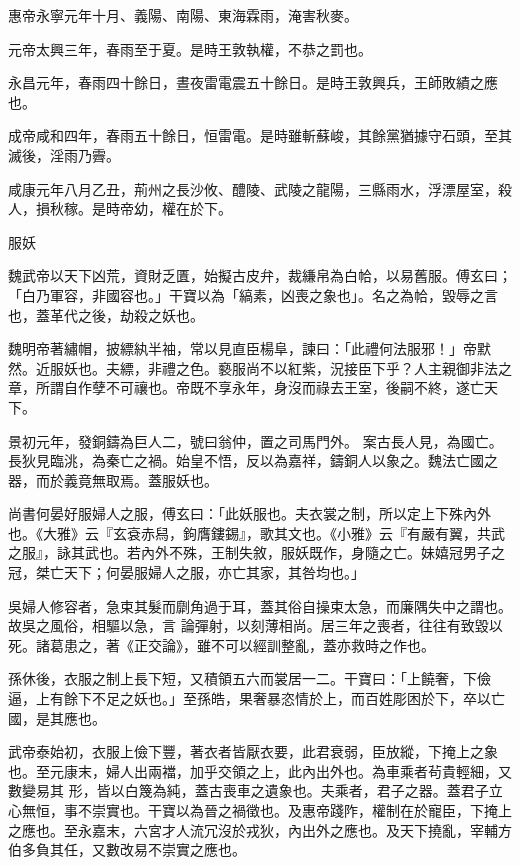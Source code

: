 \begin{pinyinscope}
 惠帝永寧元年十月、義陽、南陽、東海霖雨，淹害秋麥。



 元帝太興三年，春雨至于夏。是時王敦執權，不恭之罰也。



 永昌元年，春雨四十餘日，晝夜雷電震五十餘日。是時王敦興兵，王師敗績之應也。



 成帝咸和四年，春雨五十餘日，恒雷電。是時雖斬蘇峻，其餘黨猶據守石頭，至其滅後，淫雨乃霽。



 咸康元年八月乙丑，荊州之長沙攸、醴陵、武陵之龍陽，三縣雨水，浮漂屋室，殺人，損秋稼。是時帝幼，權在於下。



 服妖



 魏武帝以天下凶荒，資財乏匱，始擬古皮弁，裁縑帛為白帢，以易舊服。傅玄曰；「白乃軍容，非國容也。」干寶以為「縞素，凶喪之象也」。名之為帢，毀辱之言也，蓋革代之後，劫殺之妖也。



 魏明帝著繡帽，披縹紈半袖，常以見直臣楊阜，諫曰：「此禮何法服邪！」帝默然。近服妖也。夫縹，非禮之色。褻服尚不以紅紫，況接臣下乎？人主親御非法之章，所謂自作孽不可禳也。帝既不享永年，身沒而祿去王室，後嗣不終，遂亡天下。



 景初元年，發銅鑄為巨人二，號曰翁仲，置之司馬門外。
 案古長人見，為國亡。長狄見臨洮，為秦亡之禍。始皇不悟，反以為嘉祥，鑄銅人以象之。魏法亡國之器，而於義竟無取焉。蓋服妖也。



 尚書何晏好服婦人之服，傅玄曰：「此妖服也。夫衣裳之制，所以定上下殊內外也。《大雅》云『玄袞赤舄，鉤膺鏤錫』，歌其文也。《小雅》云『有嚴有翼，共武之服』，詠其武也。若內外不殊，王制失敘，服妖既作，身隨之亡。妹嬉冠男子之冠，桀亡天下；何晏服婦人之服，亦亡其家，其咎均也。」



 吳婦人修容者，急束其髮而劘角過于耳，蓋其俗自操束太急，而廉隅失中之謂也。故吳之風俗，相驅以急，言
 論彈射，以刻薄相尚。居三年之喪者，往往有致毀以死。諸葛患之，著《正交論》，雖不可以經訓整亂，蓋亦救時之作也。



 孫休後，衣服之制上長下短，又積領五六而裳居一二。干寶曰：「上饒奢，下儉逼，上有餘下不足之妖也。」至孫皓，果奢暴恣情於上，而百姓彫困於下，卒以亡國，是其應也。



 武帝泰始初，衣服上儉下豐，著衣者皆厭衣要，此君衰弱，臣放縱，下掩上之象也。至元康末，婦人出兩襠，加乎交領之上，此內出外也。為車乘者茍貴輕細，又數變易其
 形，皆以白篾為純，蓋古喪車之遺象也。夫乘者，君子之器。蓋君子立心無恒，事不崇實也。干寶以為晉之禍徵也。及惠帝踐阼，權制在於寵臣，下掩上之應也。至永嘉末，六宮才人流冗沒於戎狄，內出外之應也。及天下撓亂，宰輔方伯多負其任，又數改易不崇實之應也。




\end{pinyinscope}
